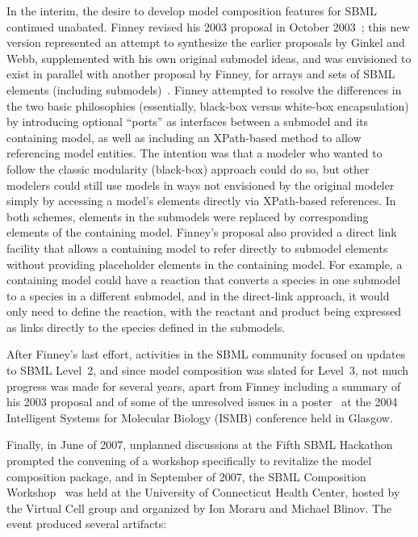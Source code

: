 In the interim, the desire to develop model composition features for
SBML continued unabated.  Finney revised his 2003 proposal in October
2003~\cite{finney:2003b}; this new version represented an attempt to
synthesize the earlier proposals by Ginkel and Webb, supplemented with
his own original submodel ideas, and was envisioned to exist in parallel
with another proposal by Finney, for arrays and sets of SBML elements
(including submodels)~\citep{finney:2003c}.  Finney attempted to resolve
the differences in the two basic philosophies (essentially, black-box
versus white-box encapsulation) by introducing optional ``ports'' as
interfaces between a submodel and its containing model, as well as
including an XPath-based method to allow referencing model entities.
The intention was that a modeler who wanted to follow the classic
modularity (black-box) approach could do so, but other modelers could
still use models in ways not envisioned by the original modeler simply
by accessing a model's elements directly via XPath-based references.  In
both schemes, elements in the submodels were replaced by corresponding
elements of the containing model.  Finney's proposal also provided a
direct link facility that allows a containing model to refer directly to
submodel elements without providing placeholder elements in the
containing model.  For example, a containing model could have a reaction
that converts a species in one submodel to a species in a different
submodel, and in the direct-link approach, it would only need to define
the reaction, with the reactant and product being expressed as links
directly to the species defined in the submodels.

After Finney's last effort, activities in the SBML community focused on
updates to SBML Level~2, and since model composition was slated for
Level~3, not much progress was made for several years, apart from Finney
including a summary of his 2003 proposal and of some of the unresolved
issues in a poster~\citep{finney:2004} at the 2004 Intelligent Systems
for Molecular Biology (ISMB) conference held in Glasgow.

Finally, in June of 2007, unplanned discussions at the Fifth SBML
Hackathon~\citep{sbml5} prompted the convening of a workshop
specifically to revitalize the model composition package, and in
September of 2007, the SBML Composition Workshop~\citep{comp2007} was
held at the University of Connecticut Health Center, hosted by the
Virtual Cell group and organized by Ion Moraru and Michael Blinov.  The
event produced several artifacts:

